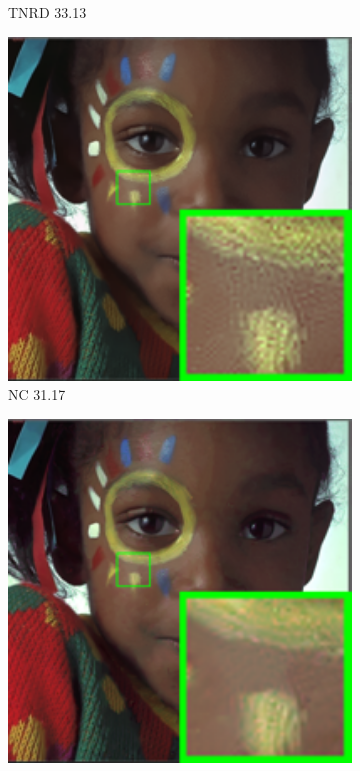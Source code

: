 \begin{figure}
\begin{subfigure}[t]{0.19\textwidth}
\caption{TNRD 33.13}
    \end{subfigure}
    \hfill
    \begin{subfigure}[t]{0.19\textwidth}
        \centering
        \includegraphics[width=1\textwidth]{images/mcwnnm/24images/resize_br_NC_nSig53015_kodim15.png}
		\caption{NC 31.17}
    \end{subfigure}
    \hfill
    \begin{subfigure}[t]{0.19\textwidth}
        \centering
        \includegraphics[width=1\textwidth]{images/mcwnnm/24images/resize_br_WNNMCW_nSig53015_kodim15.png}

\end{subfigure}
\end{figure}

